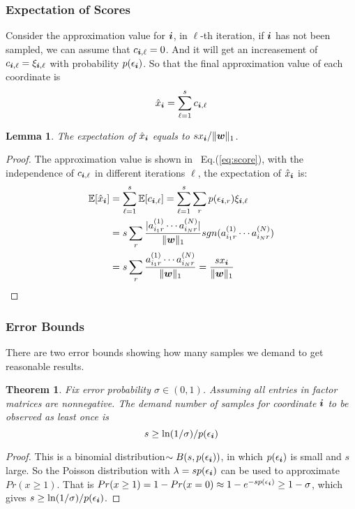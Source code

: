 \documentclass[letterpaper]{article}
\newcommand{\Sca}[3]{{#1}^{(#2)}_{i_#2#3}}%
\newcommand{\anr}[2]{\Sca{a}{#1}{#2}}
\newcommand{\score}[1]{\xi_{\V{i},#1}}
\newcommand{\V}[1]{{\boldsymbol{{\MakeLowercase{#1}}}}}
\newcommand{\predx}{\hat{x}_{\V{i}}}
\newcommand{\norm}[2]{\|#1\|_{#2}}
\newcommand{\Eqn}[1]{Eq.(\ref{eq:#1})}
\newtheorem{lemma}{Lemma}
\newtheorem{theorem}{Theorem}
\begin{document}
\subsubsection{Expectation of Scores}
Consider the approximation value for $\V{i}$, in $\ell$-th iteration,
if $\V{i}$ has not been sampled,
we can assume that $c_{\V{i},\ell}=0$.
And it will get an increasement of $c_{\V{i},\ell}=\score{\ell}$ with probability $p(\epsilon_{\V{i}})$.
So that the final approximation value of each coordinate is
\begin{equation}\label{eq:score}
\predx = \sum_{\ell=1}^{s} c_{\V{i},\ell}
\end{equation}

\begin{lemma}\label{lem:Expectation}
The expectation of $\predx$ equals to $sx_{\V{i}}/\norm{\V{w}}{1}$.
\end{lemma}
\begin{proof}
    The approximation value is shown in ~\Eqn{score},
    with the independence of $c_{\V{i},\ell}$ in different iterations $\ell$,
    the expectation of $\hat{x}_{\V{i}}$ is:
\begin{align*}
\mathbb{E}[\predx]
& = \sum_{\ell=1}^{s}\mathbb{E}[c_{\V{i},\ell}] = \sum_{\ell=1}^{s}\sum_{r} p(\epsilon_{\V{i},r})\score{\ell} \\
& = s\sum_{r} \frac{|\anr{1}{r}\cdots\anr{N}{r}|}{\norm{\V{W}}{1}}
                  sgn(\anr{1}{r}\cdots\anr{N}{r})\\
& = s\sum_{r} \frac{\anr{1}{r}\cdots\anr{N}{r}}{\norm{\V{W}}{1}}
  = \frac{sx_{\V{i}}}{\norm{\V{w}}{1}}
\end{align*}
\end{proof}

\subsubsection{Error Bounds}
There are two error bounds showing how many samples we demand to get reasonable results. 
\begin{theorem}\label{theo:ObservationBound}
Fix error probability $\sigma \in (0,1)$.
Assuming all entries in factor matrices are nonnegative.
The demand number of samples for coordinate $\V{i}$ to be observed as least once is
\[
    s \geq \ln(1/\sigma)/p(\epsilon_{\V{i}})
\]
\end{theorem}
\begin{proof}
This is a binomial distribution$\sim B(s,p(\epsilon_{\V{i}}))$,
in which $p(\epsilon_{\V{i}})$ is small and $s$ large.
So the Poisson distribution with $\lambda = sp(\epsilon_{\V{i}})$
can be used to approximate $Pr(x\geq1)$.
That is $Pr(x\geq1) = 1-Pr(x=0)\approx 1-e^{-sp(\epsilon_{\V{i}})} \geq 1-\sigma$,
which gives $s \geq \ln(1/\sigma)/p(\epsilon_{\V{i}})$.
\end{proof}
\end{document}

